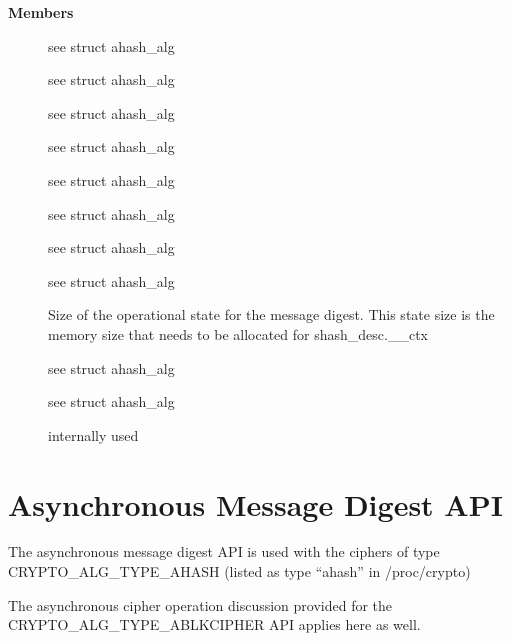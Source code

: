 \documentclass[a4paper,8pt,english]{sphinxmanual}
\begin{document}
\textbf{Members}
\begin{description}
\item[{}] \leavevmode
see struct ahash\_alg

\item[{}] \leavevmode
see struct ahash\_alg

\item[{}] \leavevmode
see struct ahash\_alg

\item[{}] \leavevmode
see struct ahash\_alg

\item[{}] \leavevmode
see struct ahash\_alg

\item[{}] \leavevmode
see struct ahash\_alg

\item[{}] \leavevmode
see struct ahash\_alg

\item[{}] \leavevmode
see struct ahash\_alg

\item[{}] \leavevmode
Size of the operational state for the message digest. This state
size is the memory size that needs to be allocated for
shash\_desc.\_\_ctx

\item[{}] \leavevmode
see struct ahash\_alg

\item[{}] \leavevmode
see struct ahash\_alg

\item[{}] \leavevmode
internally used

\end{description}


\section{Asynchronous Message Digest API}
\label{crypto/api-digest:asynchronous-message-digest-api}
The asynchronous message digest API is used with the ciphers of type
CRYPTO\_ALG\_TYPE\_AHASH (listed as type ``ahash'' in /proc/crypto)

The asynchronous cipher operation discussion provided for the
CRYPTO\_ALG\_TYPE\_ABLKCIPHER API applies here as well.
\end{document}
